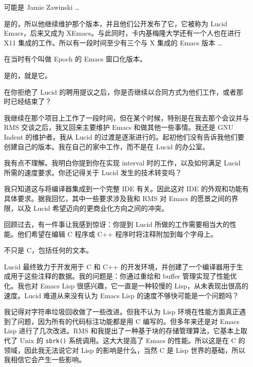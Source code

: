 \documentclass[format=acmsmall,screen]{acmart}
\begin{document}
\begin{question}
可能是 Jamie Zawinski \ldots{}
\end{question}
%
是的，所以他继续维护那个版本，并且他们公开发布了它，它被称为 Lucid Emacs，后来又成为 XEmacs。与此同时，卡内基梅隆大学还有一个人也在进行 X11 集成的工作。所以有一段时间至少有三个与 X 集成的 Emacs 版本 \ldots{}

\begin{question}
在当时有个叫做 Epoch 的 Emacs 窗口化版本。
\end{question}
%
是的，就是它。

\begin{question}
在你拒绝了 Lucid 的聘用提议之后，你是否继续以合同方式为他们工作，或者那时已经结束了？
\end{question}
%
我继续在那个项目上工作了一段时间，但在某个时候，特别是在我去那个会议并与 RMS 交谈之后，我又回来主要维护 Emacs 和做其他一些事情。我还是 GNU Indent 的维护者。我从 Lucid 的过渡是逐渐进行的。起初他们没有告诉我他们要创建自己的版本。我在自己的家中工作，而不是在 Lucid 的办公室。

\begin{question}
我有点不理解。我明白你提到你在实现 interval 时的工作，以及如何满足 Lucid 所需的速度要求。你还记得关于 Lucid 发生的技术转变吗？
\end{question}
%
我只知道这与将编译器集成到一个完整 IDE 有关。因此这对 IDE 的外观和功能有具体要求。据我回忆，其中一些要求涉及我和 RMS 对 Emacs 的愿景之间的界限，以及 Lucid 希望迈向的更商业化方向之间的冲突。

\begin{question}
回顾过去，有一件事让我感到惊讶：你提到 Lucid 所做的工作需要相当大的性能。他们希望在编辑 C 程序或 C++ 程序时将注释附加到每个字母上。
\end{question}
%
不只是 C，包括任何的文本。

\begin{question}
Lucid 最终致力于开发用于 C 和 C++ 的开发环境，并创建了一个编译器用于生成用于这些注释的数据。我的问题是：你通过重绘和 buffer 管理实现了性能优化。我也对 Emacs Lisp 很感兴趣，它一直是一种较慢的 Lisp，从未表现出很高的速度。Lucid 难道从来没有认为 Emacs Lisp 的速度不够快可能是一个问题吗？
\end{question}
%
我记得对字符串垃圾回收做了一些改进。但我不认为 Lisp 环境在性能方面真正遇到了问题，因为所有的代码标注功能都是用 C 编写的。但多年来还是对 Emacs Lisp 进行了几次改进。RMS 和我提出了一种基于块的存储管理算法，它基本上取代了 Unix 的 \texttt{sbrk()} 系统调用。这大大提高了 Emacs 的性能。所以这是在 C 的领域，因此我无法说它对 Lisp 的影响是什么，当然 C 是 Lisp 世界的基础，所以我相信它会产生一些影响。
\end{document}
